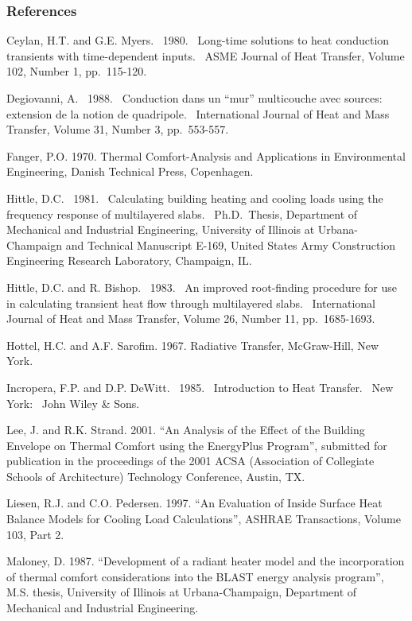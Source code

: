 \subsubsection{References}\label{references-039}

Ceylan, H.T. and G.E. Myers.~ 1980.~ Long-time solutions to heat conduction transients with time-dependent inputs.~ ASME Journal of Heat Transfer, Volume 102, Number 1, pp.~115-120.

Degiovanni, A.~ 1988.~ Conduction dans un ``mur'' multicouche avec sources:~ extension de la notion de quadripole.~ International Journal of Heat and Mass Transfer, Volume 31, Number 3, pp.~553-557.

Fanger, P.O. 1970. Thermal Comfort-Analysis and Applications in Environmental Engineering, Danish Technical Press, Copenhagen.

Hittle, D.C.~ 1981.~ Calculating building heating and cooling loads using the frequency response of multilayered slabs.~ Ph.D.~Thesis, Department of Mechanical and Industrial Engineering, University of Illinois at Urbana-Champaign and Technical Manuscript E-169, United States Army Construction Engineering Research Laboratory, Champaign, IL.

Hittle, D.C. and R. Bishop.~ 1983.~ An improved root-finding procedure for use in calculating transient heat flow through multilayered slabs.~ International Journal of Heat and Mass Transfer, Volume 26, Number 11, pp.~1685-1693.

Hottel, H.C. and A.F. Sarofim. 1967. Radiative Transfer, McGraw-Hill, New York.

Incropera, F.P. and D.P. DeWitt.~ 1985.~ Introduction to Heat Transfer.~ New York:~ John Wiley \& Sons.

Lee, J. and R.K. Strand. 2001. ``An Analysis of the Effect of the Building Envelope on Thermal Comfort using the EnergyPlus Program'', submitted for publication in the proceedings of the 2001 ACSA (Association of Collegiate Schools of Architecture) Technology Conference, Austin, TX.

Liesen, R.J. and C.O. Pedersen. 1997. ``An Evaluation of Inside Surface Heat Balance Models for Cooling Load Calculations'', ASHRAE Transactions, Volume 103, Part 2.

Maloney, D. 1987. ``Development of a radiant heater model and the incorporation of thermal comfort considerations into the BLAST energy analysis program'', M.S. thesis, University of Illinois at Urbana-Champaign, Department of Mechanical and Industrial Engineering.


